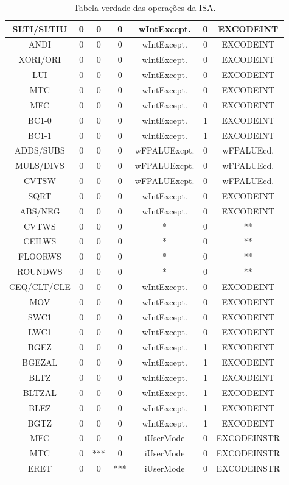 \documentclass[12pt]{article}
\begin{document}
\begin{longtable}{|c|c|c|c|c|c|c|}
		SLTI/SLTIU & 0 & 0 & 0 & wIntExcept. & 0 & EXCODEINT\\\hline
		ANDI  & 0 & 0 & 0 & wIntExcept. & 0 & EXCODEINT\\\hline
		XORI/ORI  & 0 & 0 & 0 & wIntExcept. & 0 & EXCODEINT\\\hline
		LUI  & 0 & 0 & 0 & wIntExcept. & 0 & EXCODEINT\\\hline	
		MTC  & 0 & 0 & 0 & wIntExcept. & 0 & EXCODEINT\\\hline
		MFC  & 0 & 0 & 0 & wIntExcept. & 0 & EXCODEINT\\\hline
		BC1-0  & 0 & 0 & 0 & wIntExcept. & 1 & EXCODEINT\\\hline	
		BC1-1 & 0 & 0 & 0 & wIntExcept. & 1 & EXCODEINT\\\hline
		ADDS/SUBS & 0 & 0 & 0 & wFPALUExcpt. & 0 & wFPALUEcd.\\\hline
		MULS/DIVS & 0 & 0 & 0 & wFPALUExcpt. & 0 & wFPALUEcd.\\\hline
		CVTSW & 0 & 0 & 0 & wFPALUExcpt. & 0 & wFPALUEcd.\\\hline	
		SQRT & 0 & 0 & 0 & wIntExcept. & 0 & EXCODEINT\\\hline
		ABS/NEG & 0 & 0 & 0 & wIntExcept. & 0 & EXCODEINT\\\hline
		CVTWS & 0 & 0 & 0 & * & 0 & **\\\hline
		CEILWS & 0 & 0 & 0 & * & 0 & **\\\hline
		FLOORWS & 0 & 0 & 0 & * & 0 & **\\\hline
		ROUNDWS & 0 & 0 & 0 & * & 0 & **\\\hline	
		CEQ/CLT/CLE & 0 & 0 & 0 & wIntExcept. & 0 & EXCODEINT\\\hline
		MOV & 0 & 0 & 0 & wIntExcept. & 0 & EXCODEINT\\\hline
		SWC1 & 0 & 0 & 0 & wIntExcept. & 0 & EXCODEINT\\\hline	
		LWC1 & 0 & 0 & 0 & wIntExcept. & 0 & EXCODEINT\\\hline
		BGEZ & 0 & 0 & 0 & wIntExcept. & 1 & EXCODEINT\\\hline	
		BGEZAL & 0 & 0 & 0 & wIntExcept. & 1 & EXCODEINT\\\hline
		BLTZ & 0 & 0 & 0 & wIntExcept. & 1 & EXCODEINT\\\hline
		BLTZAL & 0 & 0 & 0 & wIntExcept. & 1 & EXCODEINT\\\hline
		BLEZ & 0 & 0 & 0 & wIntExcept. & 1 & EXCODEINT\\\hline
		BGTZ & 0 & 0 & 0 & wIntExcept. & 1 & EXCODEINT\\\hline
		MFC & 0 & 0 & 0 & iUserMode & 0 & EXCODEINSTR\\\hline	
		MTC & 0 & *** & 0 & iUserMode & 0 & EXCODEINSTR\\\hline
		ERET & 0 & 0 & *** & iUserMode & 0 & EXCODEINSTR\\\hline
		
	\caption{Tabela verdade das operações da ISA.}
	\label{tab:req23}
\end{longtable}
\end{document}
